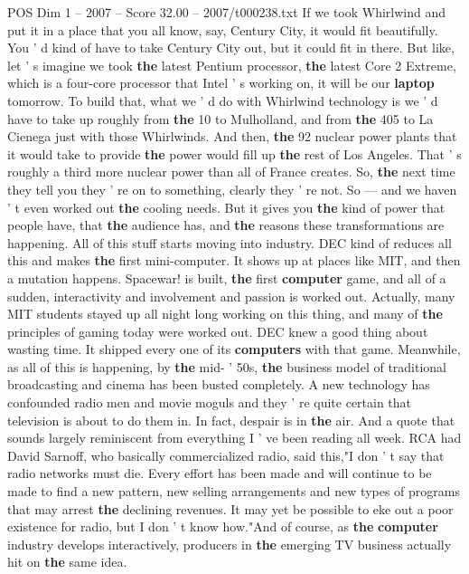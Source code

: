 \begin{textsample}{POS Dim 1 – 2007 – Score 32.00 – 2007/t000238.txt}
If we took Whirlwind and put it in a place that you all know, say, Century City, it would fit beautifully.
You ' d kind of have to take Century City out, but it could fit in there.
But like, let ' s imagine we took \textbf{the} latest Pentium processor, \textbf{the} latest Core 2 Extreme, which is a four-core processor that Intel ' s working on, it will be our \textbf{laptop} tomorrow.
To build that, what we ' d do with Whirlwind technology is we ' d have to take up roughly from \textbf{the} 10 to Mulholland, and from \textbf{the} 405 to La Cienega just with those Whirlwinds.
And then, \textbf{the} 92 nuclear power plants that it would take to provide \textbf{the} power would fill up \textbf{the} rest of Los Angeles.
That ' s roughly a third more nuclear power than all of France creates.
So, \textbf{the} next time they tell you they ' re on to something, clearly they ' re not.
So — and we haven ' t even worked out \textbf{the} cooling needs.
But it gives you \textbf{the} kind of power that people have, that \textbf{the} audience has, and \textbf{the} reasons these transformations are happening.
All of this stuff starts moving into industry.
DEC kind of reduces all this and makes \textbf{the} first mini-computer.
It shows up at places like MIT, and then a mutation happens.
Spacewar! is built, \textbf{the} first \textbf{computer} game, and all of a sudden, interactivity and involvement and passion is worked out.
Actually, many MIT students stayed up all night long working on this thing, and many of \textbf{the} principles of gaming today were worked out.
DEC knew a good thing about wasting time.
It shipped every one of its \textbf{computers} with that game.
Meanwhile, as all of this is happening, by \textbf{the} mid- ' 50s, \textbf{the} business model of traditional broadcasting and cinema has been busted completely.
A new technology has confounded radio men and movie moguls and they ' re quite certain that television is about to do them in.
In fact, despair is in \textbf{the} air.
And a quote that sounds largely reminiscent from everything I ' ve been reading all week.
RCA had David Sarnoff, who basically commercialized radio, said this,"I don ' t say that radio networks must die.
Every effort has been made and will continue to be made to find a new pattern, new selling arrangements and new types of programs that may arrest \textbf{the} declining revenues.
It may yet be possible to eke out a poor existence for radio, but I don ' t know how."And of course, as \textbf{the} \textbf{computer} industry develops interactively, producers in \textbf{the} emerging TV business actually hit on \textbf{the} same idea.

\end{textsample}
